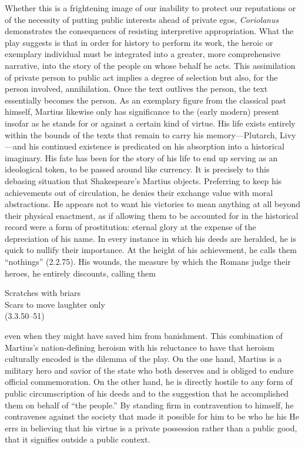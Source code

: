 Whether this is a frightening image of our inability to protect our reputations or of the necessity of putting public interests ahead of private egos, \emph{Coriolanus} demonstrates the consequences of resisting interpretive appropriation.
What the play suggests is that in order for history to perform its work, the heroic or exemplary individual must be integrated into a greater, more comprehensive narrative, into the story of the people on whose behalf he acts.
This assimilation of private person to public act implies a degree of selection but also, for the person involved, annihilation.
Once the text outlives the person, the text essentially becomes the person.
As an exemplary figure from the classical past himself, Martius likewise only has significance to the (early modern) present insofar as he stands for or against a certain kind of virtue.
His life exists entirely within the bounds of the texts that remain to carry his memory---Plutarch, Livy---and his continued existence is predicated on his absorption into a historical imaginary.
His fate has been for the story of his life to end up serving as an ideological token, to be passed around like currency.
It is precisely to this debasing situation that Shakespeare's Martius objects.
Preferring to keep his achievements out of circulation, he denies their exchange value with moral abstractions.
He appears not to want his victories to mean anything at all beyond their physical enactment, as if allowing them to be accounted for in the historical record were a form of prostitution: eternal glory at the expense of the depreciation of his name.
In every instance in which his deeds are heralded, he is quick to nullify their importance.
At the height of his achievement, he calls them ``nothings'' (2.2.75).
His wounds, the measure by which the Romans judge their heroes, he entirely discounts, calling them
\begin{vq}
Scratches with briars\\
Scars to move laughter only\\
\hfill(3.3.50--51)
\end{vq}
even when they might have saved him from banishment.
This combination of Martius's nation-defining heroism with his reluctance to have that heroism culturally encoded is the dilemma of the play.
On the one hand, Martius is a military hero and savior of the state who both deserves and is obliged to endure official commemoration.
On the other hand, he is directly hostile to any form of public circumscription of his deeds and to the suggestion that he accomplished them on behalf of ``the people.''
By standing firm in contravention to himself, he contravenes against the society that made it possible for him to be who he his
He errs in believing that his virtue is a private possession rather than a public good, that it signifies outside a public context.

